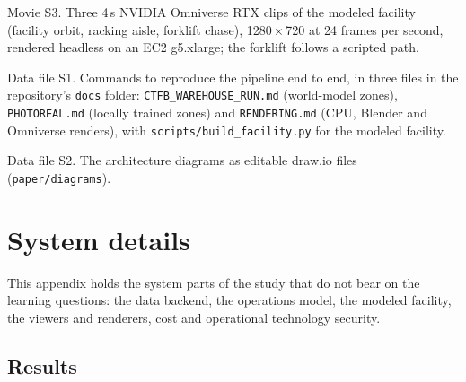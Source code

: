 \documentclass{article}
\newcommand{\code}[1]{\texttt{\small #1}}
\begin{document}
Movie S3. Three 4\,s NVIDIA Omniverse RTX clips of the modeled facility
(facility orbit, racking aisle, forklift chase), 1280\,$\times$\,720 at 24 frames per
second, rendered headless on an EC2 g5.xlarge; the forklift follows a scripted
path.

Data file S1. Commands to reproduce the pipeline end to end, in three files in
the repository's \code{docs} folder: \code{CTFB\_WAREHOUSE\_RUN.md}
(world-model zones), \code{PHOTOREAL.md} (locally trained zones) and
\code{RENDERING.md} (CPU, Blender and Omniverse renders), with
\code{scripts/build\_facility.py} for the modeled facility.

Data file S2. The architecture diagrams as editable draw.io files
(\code{paper/diagrams}).

\appendix
\section{System details}
\label{app:system}
This appendix holds the system parts of the study that do not bear on the learning questions: the data backend, the operations model, the modeled facility, the viewers and renderers, cost and operational technology security.

\subsection{Results}
\end{document}
